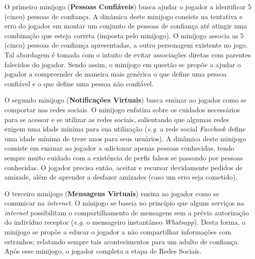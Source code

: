 O primeiro minijogo (\textbf{Pessoas Confiáveis}) busca ajudar o jogador a identificar 5 (cinco) pessoas de confiança. A dinâmica deste minijogo consiste na tentativa e erro do jogador em montar um conjunto de pessoas de confiança até atingir uma combinação que esteja correta (imposta pelo minijogo). O minijogo associa as 5 (cinco) pessoas de confiança apresentadas, a outro personagem existente no jogo. Tal abordagem é tomada com o intuito de evitar associações diretas com parentes falecidos do jogador. Sendo assim, o minijogo em questão se propõe a ajudar o jogador a compreender de maneira mais genérica o que define uma pessoa confiável e o que define uma pessoa não confiável. 


O segundo minijogo (\textbf{Notificações Virtuais}) busca ensinar ao jogador como se comportar nas redes sociais. O minijogo enfatiza sobre os cuidados necessários para se acessar e se utilizar as redes sociais, salientando que algumas redes exigem uma idade mínima para sua utilização (\textit{e.g.} a rede social \textit{Facebook} define uma idade mínima de treze anos para seus usuários). A dinâmica deste minijogo consiste em ensinar ao jogador a adicionar apenas pessoas conhecidas, tendo sempre muito cuidado com a existência de perfis falsos se passando por pessoas conhecidas. O jogador precisa então, aceitar e recursar devidamente pedidos de amizade, além de aprender a desfazer amizades (caso um erro seja cometido). 

O terceiro minijogo (\textbf{Mensagens Virtuais}) ensina ao jogador como se comunicar na \textit{internet}. O minijogo se baseia no princípio que alguns serviços na \textit{internet} possibilitam o compartilhamento de mensagens sem a prévia autorização do indivíduo receptor (\textit{e.g.} o mensageiro instantâneo \textit{Whatsapp}). Desta forma, o minijogo se propõe a educar o jogador a não compartilhar informações com estranhos; relatando sempre tais acontecimentos para um adulto de confiança. Após esse minijogo, o jogador completa a etapa de Redes Sociais. 

